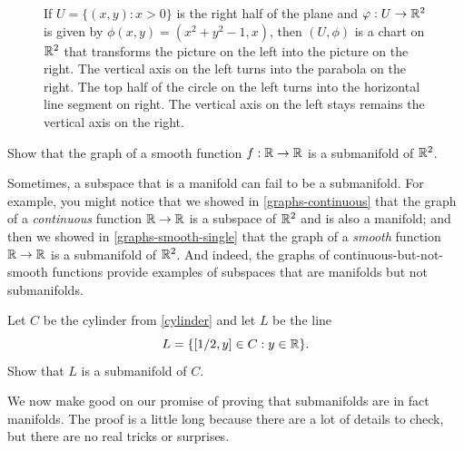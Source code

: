\begin{exercise}
\begin{figure}
\begin{center}
		\end{center}
		\caption{If $U = \{(x,y) : x > 0\}$ is the right half of the plane and $\varphi : U \to \mathbb{R}^2$ is given by $\phi(x,y) = (x^2 + y^2 - 1, x)$, then $(U, \phi)$ is a chart on $\mathbb{R}^2$ that transforms the picture on the left into the picture on the right. The vertical axis on the left turns into the parabola on the right. The top half of the circle on the left turns into the horizontal line segment on right. The vertical axis on the left stays remains the vertical axis on the right.}  \label{circle-submanifold-picture}
	\end{figure}
\end{exercise}

\begin{exercise} \label{graphs-smooth-single}
	Show that the graph of a smooth function $f : \mathbb{R} \to \mathbb{R}$ is a submanifold of $\mathbb{R}^2$. 
\end{exercise}

\begin{caution}
	Sometimes, a subspace that is a manifold can fail to be a submanifold. For example, you might notice that we showed in \cref{graphs-continuous} that the graph of a \emph{continuous} function $\mathbb{R} \to \mathbb{R}$ is a subspace of $\mathbb{R}^2$ and is also a manifold; and then we showed in \cref{graphs-smooth-single} that the graph of a \emph{smooth} function $\mathbb{R} \to \mathbb{R}$ is a submanifold of $\mathbb{R}^2$. And indeed, the graphs of continuous-but-not-smooth functions provide examples of subspaces that are manifolds but not submanifolds. 
\end{caution}

\begin{exercise}
	Let $C$ be the cylinder from \cref{cylinder} and let $L$ be the line \[ L = \{ [1/2, y] \in C : y \in \mathbb{R} \}. \] Show that $L$ is a submanifold of $C$. 
\end{exercise}

We now make good on our promise of proving that submanifolds are in fact manifolds. The proof is a little long because there are a lot of details to check, but there are no real tricks or surprises. 

